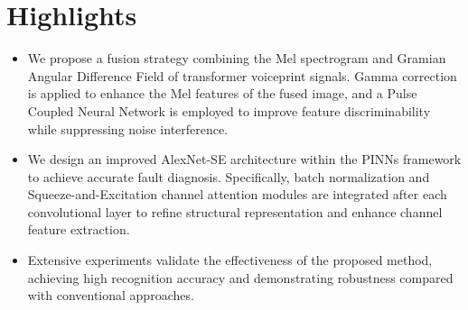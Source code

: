 \documentclass{article}
\begin{document}
	
\section*{Highlights}

\begin{itemize}
	\item We propose a fusion strategy combining the Mel spectrogram and Gramian Angular Difference Field of transformer voiceprint signals. Gamma correction is applied to enhance the Mel features of the fused image, and a Pulse Coupled Neural Network is employed to improve feature discriminability while suppressing noise interference.
	\item We design an improved AlexNet-SE architecture within the PINNs framework to achieve accurate fault diagnosis. Specifically, batch normalization and Squeeze-and-Excitation channel attention modules are integrated after each convolutional layer to refine structural representation and enhance channel feature extraction.
	\item Extensive experiments validate the effectiveness of the proposed method, achieving high recognition accuracy and demonstrating robustness compared with conventional approaches.
\end{itemize}
\end{document}
